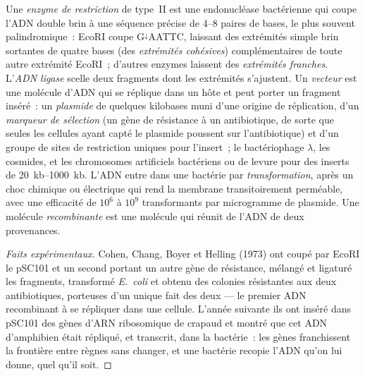 \begin{definition}\label{def:b3:genetic-engineering:tools}
Une \emph{enzyme de restriction} de type~II est une endonucléase
bactérienne qui coupe l'ADN double brin à une séquence précise de
\numrange{4}{8} paires de bases, le plus souvent palindromique~: EcoRI
coupe G$^{\downarrow}$AATTC, laissant des extrémités simple brin
sortantes de quatre bases (des \emph{extrémités cohésives})
complémentaires de toute autre extrémité EcoRI~; d'autres enzymes
laissent des \emph{extrémités franches}. L'\emph{ADN ligase} scelle
deux fragments dont les extrémités s'ajustent. Un \emph{vecteur} est
une molécule d'ADN qui se réplique dans un hôte et peut porter un
fragment inséré~: un \emph{plasmide} de quelques kilobases muni d'une
origine de réplication, d'un \emph{marqueur de sélection} (un gène de
résistance à un antibiotique, de sorte que seules les cellules ayant
capté le plasmide poussent sur l'antibiotique) et d'un groupe de sites
de restriction uniques pour l'insert~; le bactériophage $\lambda$, les
cosmides, et les chromosomes artificiels bactériens ou de levure pour
des inserts de \qtyrange{20}{1000}{kb}. L'ADN entre dans une bactérie
par \emph{transformation}, après un choc chimique ou électrique qui
rend la membrane transitoirement perméable, avec une efficacité de
$10^{6}$ à $10^{9}$ transformants par microgramme de plasmide. Une
molécule \emph{recombinante} est une molécule qui réunit de l'ADN de
deux provenances.
\end{definition}

\begin{proof}[Faits expérimentaux]
Cohen, Chang, Boyer et Helling (1973) ont coupé par EcoRI le 
pSC101 et un second  portant un autre gène de résistance,
mélangé et ligaturé les fragments, transformé \emph{E.~coli} et obtenu
des colonies résistantes aux deux antibiotiques, porteuses d'un unique
 fait des deux --- le premier ADN recombinant à se répliquer
dans une cellule. L'année suivante ils ont inséré dans pSC101 des gènes
d'ARN ribosomique de crapaud et montré que cet ADN d'amphibien était
répliqué, et transcrit, dans la bactérie~: les gènes franchissent la
frontière entre règnes sans changer, et une bactérie recopie l'ADN
qu'on lui donne, quel qu'il soit.
\end{proof}

